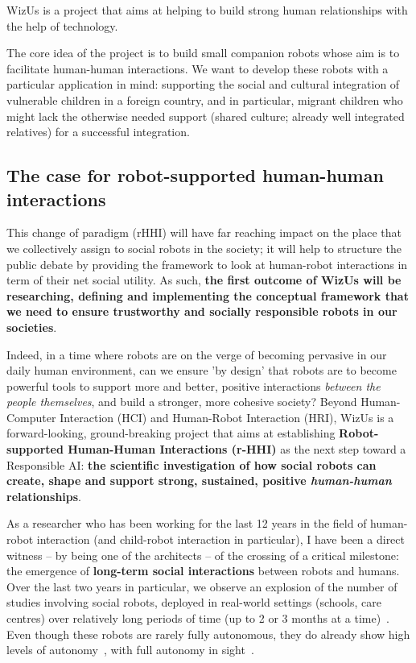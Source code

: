\documentclass[11pt,a4paper]{report}
\newcommand{\project}{WizUs\xspace}
\begin{document}
\project is a project that aims at helping to build strong human
relationships with the help of technology.

The core idea of the project is to build small companion robots whose
aim is to facilitate human-human interactions. We want to develop these
robots with a particular application in mind: supporting the social and
cultural integration of vulnerable children in a foreign country, and in
particular, migrant children who might lack the otherwise needed support
(shared culture; already well integrated relatives) for a successful
integration.

\subsection{The case for robot-supported human-human interactions}

This change of paradigm (rHHI) will have far reaching impact on the place that
we collectively assign to social robots in the society; it will help to
structure the public debate by providing the framework to look at human-robot
interactions in term of their net social utility.  As such, \textbf{the first
outcome of \project will be researching, defining and implementing the
conceptual framework that we need to ensure trustworthy and socially responsible
robots in our societies}.

Indeed, in a time where robots are on the verge of becoming pervasive in our
daily human environment, can we ensure 'by design' that robots are to become
powerful tools to support more and better, positive interactions \emph{between
the people themselves}, and build a stronger, more cohesive society? Beyond
Human-Computer Interaction (HCI) and Human-Robot Interaction (HRI), \project is
a forward-looking, ground-breaking project that aims at establishing
\textbf{Robot-supported Human-Human Interactions (r-HHI)} as the next step
toward a Responsible AI: \textbf{the scientific investigation of how social
robots can create, shape and support strong, sustained, positive
\emph{human-human} relationships}.

As a researcher who has been working for the last 12 years in the field of
human-robot interaction (and child-robot interaction in particular), I have been
a direct witness -- by being one of the architects -- of the crossing of a
critical milestone: the emergence of \textbf{long-term social interactions}
between robots and humans. Over the last two years in particular, we observe an
explosion of the number of studies involving social robots, deployed in
real-world settings (schools, care centres) over relatively long periods of time
(up to 2 or 3 months at a time)~\cite{kunze2018artificial,leite2013social}. Even
though these robots are rarely fully autonomous, they do already show high
levels of autonomy~\cite{senft2019teaching}, with full autonomy in
sight~\cite{hawes2017strands}.
\end{document}
